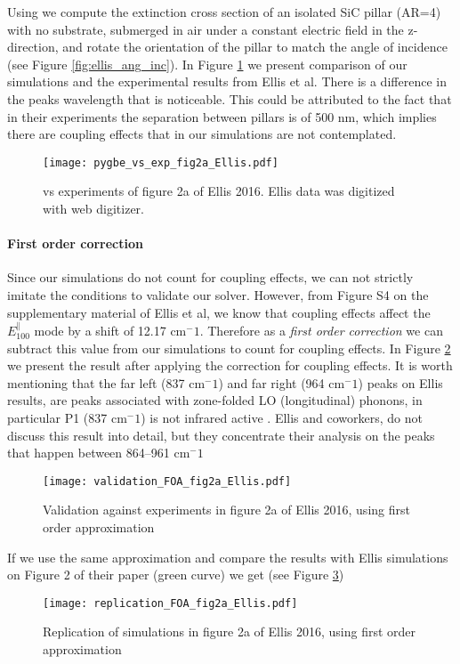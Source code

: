 Using \pygbe we compute the extinction cross section of an isolated SiC pillar (AR=4)
with no substrate, submerged in air under a constant electric field in the z-direction, 
and rotate the orientation of the pillar to match the angle of incidence (see Figure \ref{fig:ellis_ang_inc}).
In Figure \ref{fig:pygbe_vs_exp_2a} we present 
comparison of our simulations and the experimental results from Ellis et al. There is a 
difference in the peaks wavelength that is noticeable. This could be attributed to the
fact that in their experiments the separation between pillars is of 500 nm, which implies
there are coupling effects that in our simulations are not contemplated.  

\begin{figure}
    \centering
    \texttt{[image: pygbe\_vs\_exp\_fig2a\_Ellis.pdf]} 
    \caption{\pygbe vs experiments of figure 2a of Ellis 2016. Ellis data 
    was digitized with web digitizer.}
    \label{fig:pygbe_vs_exp_2a}
 \end{figure}

\paragraph{First order correction}

Since our simulations do not count for coupling effects, we can not strictly imitate 
the conditions to validate our solver. However, from Figure S4 on the supplementary 
material of Ellis et al, we know that coupling effects affect the $E^{\parallel}_{100}$ 
mode by a shift of 12.17 cm$^-1$. Therefore as a \textit{first order correction} we can 
subtract this value from our simulations to count for coupling effects. In Figure 
\ref{fig:val_2a} we present the result after applying the correction for coupling effects.
It is worth mentioning that the far left (837 cm$^-1$) and far right (964 cm$^-1$) peaks 
on Ellis results, are peaks associated with zone-folded LO (longitudinal) phonons, in 
particular P1 (837 cm$^-1$) is not infrared active \cite{ellis2016}. Ellis and coworkers, 
do not discuss this result into detail, but they concentrate their analysis on the peaks
that happen between 864–961 cm$^-1$ 

\begin{figure}
    \centering
    \texttt{[image: validation\_FOA\_fig2a\_Ellis.pdf]} 
    \caption{Validation against experiments in figure 2a of Ellis 2016, using first order approximation}
    \label{fig:val_2a}
 \end{figure}

If we use the same approximation and compare the results with Ellis simulations on
Figure 2 of their paper (green curve) we get (see Figure \ref{fig:rep_2a})

\begin{figure}
    \centering
    \texttt{[image: replication\_FOA\_fig2a\_Ellis.pdf]} 
    \caption{Replication of simulations in figure 2a of Ellis 2016, using first
     order approximation}
    \label{fig:rep_2a}
 \end{figure}